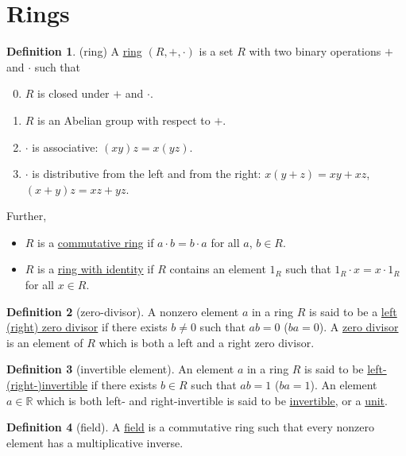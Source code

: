 \documentclass[a4paper,10pt]{scrreprt}
\newcommand{\R}{\mathbb{R}}
\newcommand{\defn}[1]{\ul{#1}}
\theoremstyle{definition}
\newtheorem{definition}{Definition}[section]
\theoremstyle{plain}
\theoremstyle{remark}
\begin{document}
\section{Rings}

\begin{definition}(ring)
  \label{def:ring}
  A \defn{ring} $(R, +, \cdot )$ is a set $R$ with two binary operations $+$ and $\cdot $ such that
  \begin{enumerate}
      \setcounter{enumi}{-1}
    \item $R$ is closed under $+$ and $\cdot$.
    \item $R$ is an Abelian group with respect to $+$.
    \item $\cdot$ is associative: $(xy)z = x(yz)$.
    \item $\cdot$ is distributive from the left and from the right: $x(y+z) = xy + xz$, $(x+y)z = xz + yz$.
  \end{enumerate}

  Further,
  \begin{itemize}
    \item $R$ is a \defn{commutative ring} if $a\cdot b = b \cdot a$ for all $a$, $b \in R$.
    \item $R$ is a \defn{ring with identity} if $R$ contains an element $1_{R}$ such that $1_{R}\cdot  x = x\cdot 1_{R}$ for all $x \in R$.
  \end{itemize}
\end{definition}

\begin{definition}[zero-divisor]
  \label{def:zerodivisor}
  A nonzero element $a$ in a ring $R$ is said to be a \defn{left (right) zero divisor} if there exists $b \neq 0$ such that $ab=0$ ($ba=0$). A \defn{zero divisor} is an element of $R$ which is both a left and a right zero divisor.
\end{definition}

\begin{definition}[invertible element]
  \label{def:ringinvertible}
  An element $a$ in a ring $R$ is said to be \defn{left- (right-)invertible} if there exists $b \in R$ such that $ab=1$ ($ba=1$). An element $a \in \R$ which is both left- and right-invertible is said to be \defn{invertible}, or a \defn{unit}.
\end{definition}

\begin{definition}[field]
  \label{def:field}
  A \defn{field} is a commutative ring such that every nonzero element has a multiplicative inverse.
\end{definition}
\end{document}
